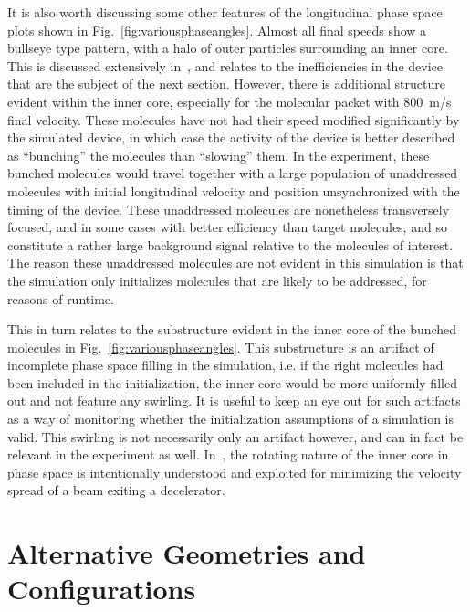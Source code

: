 It is also worth discussing some other features of the longitudinal phase space plots shown in Fig.~\ref{fig:variousphaseangles}. 
Almost all final speeds show a bullseye type pattern, with a halo of outer particles surrounding an inner core.
This is discussed extensively in~\cite{VanDeMeerakker2006}, and relates to the inefficiencies in the device that are the subject of the next section.
However, there is additional structure evident within the inner core, especially for the molecular packet with $800$~m/s final velocity.
These molecules have not had their speed modified significantly by the simulated device, in which case the activity of the device is better described as ``bunching'' the molecules than ``slowing'' them.
In the experiment, these bunched molecules would travel together with a large population of unaddressed molecules with initial longitudinal velocity and position unsynchronized with the timing of the device.
These unaddressed molecules are nonetheless transversely focused, and in some cases with better efficiency than target molecules, and so constitute a rather large background signal relative to the molecules of interest.
The reason these unaddressed molecules are not evident in this simulation is that the simulation only initializes molecules that are likely to be addressed, for reasons of runtime.

This in turn relates to the substructure evident in the inner core of the bunched molecules in Fig.~\ref{fig:variousphaseangles}.
This substructure is an artifact of incomplete phase space filling in the simulation, i.e. if the right molecules had been included in the initialization, the inner core would be more uniformly filled out and not feature any swirling.
It is useful to keep an eye out for such artifacts as a way of monitoring whether the initialization assumptions of a simulation is valid. 
This swirling is not necessarily only an artifact however, and can in fact be relevant in the experiment as well.
In~\cite{Parazzoli2009}, the rotating nature of the inner core in phase space is intentionally understood and exploited for minimizing the velocity spread of a beam exiting a decelerator.

\section{Alternative Geometries and Configurations}

